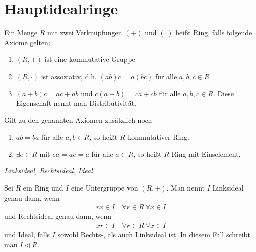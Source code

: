 \section{Hauptidealringe}

Ein Menge $R$ mit zwei Verknüpfungen $(+)$ und $(\cdot)$ heißt Ring, falls folgende Axiome gelten:
\begin{enumerate}
    \item $(R,+)$ ist eine kommutative Gruppe
    \item $(R,\cdot)$ ist assoziativ, d.h. $(a b) c = a (b c)$ für alle $a, b, c \in R$
    \item $(a + b) c = a c + a b$ und $c (a + b) = c a + c b$ für alle $a, b, c \in R$. Diese Eigenschaft nennt man Distributivität.
\end{enumerate}
Gilt zu den genannten Axiomen zusätzlich noch
\begin{enumerate}
    \item $a b = b a$ für alle $a, b \in R$, so heißt $R$ kommutativer Ring.
    \item $\exists e \in R$ mit $e a = a e = a$ für alle $a \in R$, so heißt $R$ Ring mit Einselement.
\end{enumerate}

\begin{mydef} \textit{Linksideal, Rechtsideal, Ideal}\medskip

    Sei $R$ ein Ring und $I$ eine Untergruppe von $(R,+)$. Man nennt $I$ Linksideal genau dann, wenn
    \begin{align*}
        rx \in I \quad \forall r \in R \ \forall x \in I
    \end{align*}
    und Rechtsideal genau dann, wenn
    \begin{align*}
        xr \in I \quad \forall r \in R \ \forall x \in I
    \end{align*}
    und Ideal, falls $I$ sowohl Rechts-, als auch Linksideal ist. In diesem Fall schreibt man $I \lhd R$.
\end{mydef}

